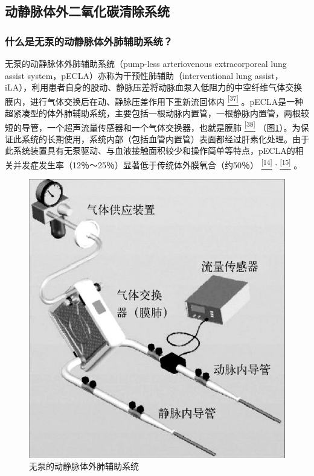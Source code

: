 \subsection{动静脉体外二氧化碳清除系统}

\subsubsection{什么是无泵的动静脉体外肺辅助系统？}

无泵的动静脉体外肺辅助系统（pump-less arteriovenous extracorporeal lung
assist system，pECLA）亦称为干预性肺辅助（interventional lung
assist，iLA），利用患者自身的股动、静脉压差将动脉血泵入低阻力的中空纤维气体交换膜内，进行气体交换后在动、静脉压差作用下重新流回体内
\protect\hyperlink{text00030.htmlux5cux23ch37-29}{\textsuperscript{{[}37{]}}}
。pECLA是一种超紧凑型的体外肺辅助系统，主要包括一根动脉内置管，一根静脉内置管，两根较短的导管，一个超声流量传感器和一个气体交换器，也就是膜肺
\protect\hyperlink{text00030.htmlux5cux23ch38-29}{\textsuperscript{{[}38{]}}}
（图\ref{fig24-2}）。为保证此系统的长期使用，系统内部（包括血管内置管）表面都经过肝素化处理。由于此系统装置具有无泵驱动、与血液接触面积较少和操作简单等特点，pECLA的相关并发症发生率（12％～25％）显著低于传统体外膜氧合（约50％）
\protect\hyperlink{text00030.htmlux5cux23ch14-29}{\textsuperscript{{[}14{]}}}
\textsuperscript{,}
\protect\hyperlink{text00030.htmlux5cux23ch15-29}{\textsuperscript{{[}15{]}}}
。

\begin{figure}[!htbp]
 \centering
 \includegraphics{./images/Image00289.jpg}
 \captionsetup{justification=centering}
 \caption{无泵的动静脉体外肺辅助系统}
 \label{fig24-2}
  \end{figure} 

